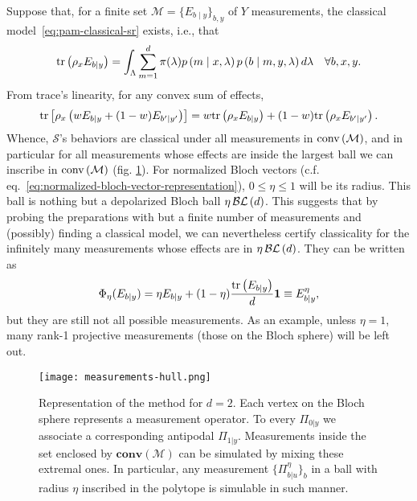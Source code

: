         Suppose that, for a finite set $\mathcal{M} = \{ E_{b \mid y} \}_{b,y}$ of $Y$ measurements, the classical model~\eqref{eq:pam-classical-sr} exists, i.e., that
        \begin{equation}
            \text{tr}\left( \rho_x E_{b\mid y} \right) = \int_{\Lambda} \sum_{m = 1}^{d} \pi(\lambda) p \left( m \mid x,\lambda \right) p \left( b \mid m,y,\lambda \right) d\lambda \quad\forall b,x,y .
        \label{eq:quantum-classicality-model}
        \end{equation}
        From trace's linearity, for any convex sum of effects,
        \begin{equation*}
            \text{tr}\left[ \rho_x \left( w E_{b\mid y} + (1-w) E_{b^\prime \mid y^\prime} \right) \right] = w\text{tr}\left( \rho_x E_{b\mid y} \right) + (1-w) \text{tr}\left( \rho_x E_{b^\prime \mid y^\prime} \right) .
        \end{equation*}
        Whence, $\mathcal{S}$'s behaviors are classical under all measurements in $\text{conv} \left( \mathcal{M} \right)$, and in particular for all measurements whose effects are inside the largest ball we can inscribe in $\text{conv} \left( \mathcal{M} \right)$ (fig. \ref{fig:measurements-hull}). For normalized Bloch vectors (c.f. eq.~\eqref{eq:normalized-bloch-vector-representation}), $0 \leq \eta \leq 1$ will be its radius. This ball is nothing but a depolarized Bloch ball $\eta \, \mathcal{BL}\left( d \right)$. This suggests that by probing the preparations with but a finite number of measurements and (possibly) finding a classical model, we can nevertheless certify classicality for the infinitely many measurements whose effects are in $\eta \, \mathcal{BL}\left( d \right)$. They can be written as
        \begin{equation}
            \Phi_\eta(E_{b \mid y}) = \eta E_{b \mid y} + (1 - \eta) \frac{ \text{tr}\left( E_{b \mid y} \right) }{d} \mathbf{1} \equiv E_{b \mid y}^\eta,
            \label{depolarized-measurements}
        \end{equation}
        but they are still not all possible measurements. As an example, unless $\eta = 1$, many rank-1 projective measurements (those on the Bloch sphere) will be left out.

        \begin{figure}
            \centering
            \texttt{[image: measurements-hull.png]}
            \caption{Representation of the method for $d = 2$. Each vertex on the Bloch sphere represents a measurement operator. To every $\Pi_{0 \vert y}$ we associate a corresponding antipodal $\Pi_{1 \vert y}$. Measurements inside the set enclosed by $\textbf{conv}(\mathcal{M})$ can be simulated by mixing these extremal ones. In particular, any measurement $\{ \Pi_{b \vert u}^\eta \}_b$ in a ball with radius $\eta$ inscribed in the polytope is simulable in such manner.}
        \label{fig:measurements-hull}
    \end{figure}

